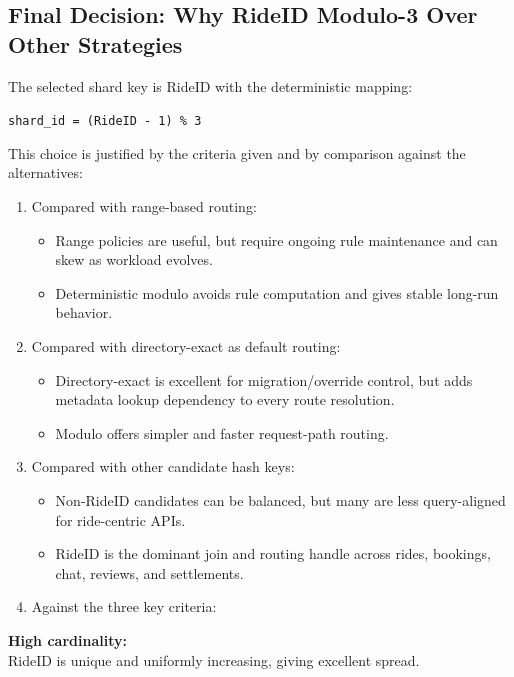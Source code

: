 \documentclass[12pt]{article}
\begin{document}
\subsection{Final Decision: Why RideID Modulo-3 Over Other Strategies}

The selected shard key is RideID with the deterministic mapping:

\texttt{shard\_id = (RideID - 1) \% 3}

This choice is justified by the criteria given and by comparison against the alternatives:

\begin{enumerate}
    \item Compared with range-based routing:
    \begin{itemize}
        \item Range policies are useful, but require ongoing rule maintenance and can skew as workload evolves.
        \item Deterministic modulo avoids rule computation and gives stable long-run behavior.
    \end{itemize}

    \item Compared with directory-exact as default routing:
    \begin{itemize}
        \item Directory-exact is excellent for migration/override control, but adds metadata lookup dependency to every route resolution.
        \item Modulo offers simpler and faster request-path routing.
    \end{itemize}

    \item Compared with other candidate hash keys:
    \begin{itemize}
        \item Non-RideID candidates can be balanced, but many are less query-aligned for ride-centric APIs.
        \item RideID is the dominant join and routing handle across rides, bookings, chat, reviews, and settlements.
    \end{itemize}

    \item Against the three key criteria:
\end{enumerate}

\textbf{High cardinality:}\\
RideID is unique and uniformly increasing, giving excellent spread.
\end{document}
